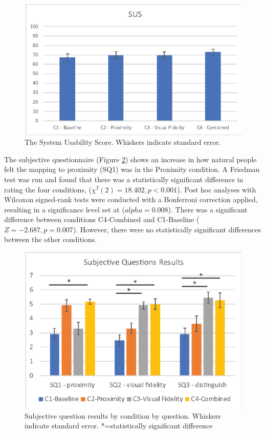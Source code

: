\begin{figure}[ht]
    \centering
    \includegraphics[width=0.8\linewidth]{images/41-visualising-mgia17/analysis-images-02.eps}
    \caption{The System Usability Score. Whiskers indicate standard error.}
    \label{fig:contacts:sus}
\end{figure}

The subjective questionnaire (Figure \ref{fig:contacts:sq2}) shows an increase in how natural people felt the mapping to proximity (SQ1) was in the Proximity condition. A Friedman test was run and found that there was a statistically significant difference in rating the four conditions, ($\chi^2(2)=18.402,p<0.001$). Post hoc analyses with Wilcoxon signed-rank tests were conducted with a Bonferroni correction applied, resulting in a significance level set at ($alpha=0.008$). There was a significant difference between conditions C4-Combined and C1-Baseline ($Z=-2.687, p=0.007$). However, there were no statistically significant differences between the other conditions.

\begin{figure}[ht]
    \centering
    \includegraphics[width=0.8\linewidth]{images/41-visualising-mgia17/analysis-images-05.eps}
    \caption{Subjective question results by condition by question. Whiskers indicate standard error. *=statistically significant difference}
    \label{fig:contacts:sq2}
\end{figure}

